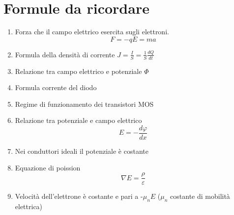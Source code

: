 \documentclass{article}
\begin{document}
\section*{Formule da ricordare}
\begin{enumerate}
    \item
        Forza che il campo elettrico esercita sugli elettroni.
        \[
            F = -q E = ma
        \]

    \item Formula della densità di corrente $J = \frac{I}{S} = \frac{1}{S}\frac{dQ}{dt}$
    \item Relazione tra campo elettrico e potenziale $\Phi$
    \item Formula corrente del diodo
    \item Regime di funzionamento dei transistori MOS
    \item Relazione tra potenziale e campo elettrico
        \[
            E = - \frac{d \varphi}{dx}
        \]

    \item Nei conduttori ideali il potenziale è costante
    \item Equazione di poission
    \[
        \nabla E = \frac\rho\varepsilon
    \]
    \item Velocità dell'elettrone è costante e pari a -$\mu_n E$ ($\mu_n$ costante di mobilità elettrica)
\end{enumerate}
\end{document}
